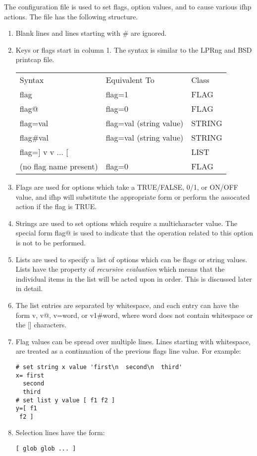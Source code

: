 \documentclass[a4paper]{article}
\begin{document}
The configuration file is used to set flags, option values, and to cause
various
{\ttfamily ifhp}
actions.
The file has the following structure.
\begin{enumerate}
\item   Blank lines and lines starting with \# are ignored.
\item   Keys or flags start in column 1.
The syntax is similar to the LPRng and BSD
{\ttfamily printcap}
file.
\begin{center}
\begin{tabular}{lll}
Syntax& Equivalent To& Class\\ 
flag& flag=1& FLAG\\ 
flag@& flag=0& FLAG\\ 
flag=val& flag=val (string value)& STRING\\ 
flag\#val& flag=val (string value)& STRING\\ 
flag={]} v v ... {[} & & LIST\\ 
(no flag name present)& flag=0& FLAG\\ 
\end{tabular}
\end{center}
\item Flags are used for options which take a TRUE/FALSE, 0/1, or ON/OFF
value, and
{\ttfamily ifhp}
will substitute the appropriate form or perform the
assocated action if the flag is TRUE.
\item Strings are used to set options which require a multicharacter value.
The special form
{\ttfamily flag@}
is used to indicate that the operation
related to this option is not to be performed.
\item Lists are used to specify a list of options which can be flags or string
values.
Lists have the property of
{\itshape recursive evaluation\/}
which means that the individual items in the list will be acted upon in order.
This is discussed later in detail.
\item The list entries are separated by whitespace,
and each entry can have the form v, v@,
v=word, or v1\#word, where word does not contain whitespace or
the {[}{]} characters.
\item Flag values can be spread over multiple lines.  Lines starting with
whitespace, are treated as a continuation of the previous
flags line value.  For example:
\begin{tscreen}
\begin{verbatim}
# set string x value 'first\n  second\n  third'
x= first
  second
  third
# set list y value [ f1 f2 ]
y=[ f1
 f2 ]
\end{verbatim}
\end{tscreen}
\item Selection lines have the form:
\begin{tscreen}
\begin{verbatim}
[ glob glob ... ]
\end{verbatim}
\end{tscreen}


\end{enumerate}
\end{document}
